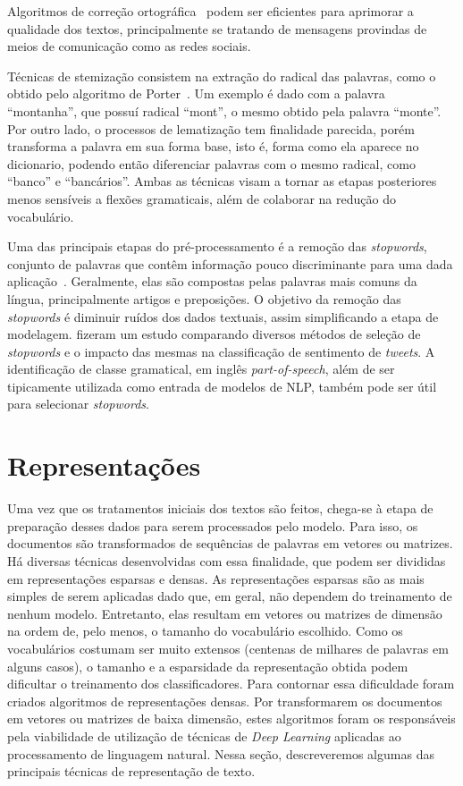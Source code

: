 Algoritmos de correção ortográfica~\cite{damerau64}\cite{navarro01} podem ser
eficientes para aprimorar a qualidade dos textos, principalmente se tratando de
mensagens provindas de meios de comunicação como as redes sociais.

Técnicas de stemização consistem na extração do radical das palavras, como o
obtido pelo algoritmo de Porter~\cite{porter80}.
Um exemplo é dado com a palavra ``montanha'', que possuí radical ``mont'', o
mesmo obtido pela palavra ``monte''.
Por outro lado, o processos de lematização tem finalidade parecida, porém
transforma a palavra em sua forma base, isto é, forma como ela aparece no
dicionario, podendo então diferenciar palavras com o mesmo radical, como
``banco'' e ``bancários''.
Ambas as técnicas visam a tornar as etapas posteriores menos sensíveis a flexões
gramaticais, além de colaborar na redução do vocabulário.

Uma das principais etapas do pré-processamento é a remoção das
\textit{stopwords}, conjunto de palavras que contêm informação pouco discriminante
para uma dada aplicação~\cite{lo05}.
Geralmente, elas são compostas pelas palavras mais comuns da língua,
principalmente artigos e preposições.
O objetivo da remoção das \textit{stopwords} é diminuir ruídos dos dados
textuais, assim simplificando a etapa de modelagem.
\citet{saif14} fizeram um estudo comparando diversos métodos de seleção de
\textit{stopwords} e o impacto das mesmas na classificação de sentimento de
\textit{tweets}.
A identificação de classe gramatical, em inglês \textit{part-of-speech}, além de
ser tipicamente utilizada como entrada de modelos de NLP, também pode ser útil
para selecionar \textit{stopwords}.

\section{Representações}

Uma vez que os tratamentos iniciais dos textos são feitos, chega-se à etapa de
preparação desses dados para serem processados pelo modelo.
Para isso, os documentos são transformados de sequências de palavras em vetores
ou matrizes.
Há diversas técnicas desenvolvidas com essa finalidade, que podem ser divididas
em representações esparsas e densas.
As representações esparsas são as mais simples de serem aplicadas dado que, em
geral, não dependem do treinamento de nenhum modelo.
Entretanto, elas resultam em vetores ou matrizes de dimensão na ordem de, pelo
menos, o tamanho do vocabulário escolhido.
Como os vocabulários costumam ser muito extensos (centenas de milhares de palavras em
alguns casos), o tamanho e a esparsidade da representação obtida podem dificultar
o treinamento dos classificadores.
Para contornar essa dificuldade foram criados algoritmos de representações
densas.
Por transformarem os documentos em vetores ou matrizes de baixa dimensão, estes
algoritmos foram os responsáveis pela viabilidade de utilização de técnicas de
\textit{Deep Learning} aplicadas ao processamento de linguagem natural.
Nessa seção, descreveremos algumas das principais técnicas de representação de
texto.

